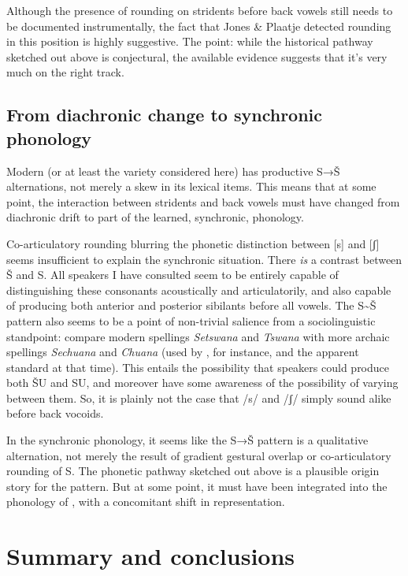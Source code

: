 \documentclass[output=paper,newtxmath,modfonts,nonflat]{langsci/langscibook}
\begin{document}
Although the presence of rounding on stridents before back vowels still needs to be documented instrumentally, the fact that Jones \& Plaatje detected rounding in this position is highly suggestive. The point: while the historical pathway sketched out above is conjectural, the available evidence suggests that it’s very much on the right track.

\subsection{From diachronic change to synchronic phonology}\label{sec:bennett:4.3}

Modern  (or at least the variety considered here) has productive S→Š alternations, not merely a skew in its lexical items. This means that at some point, the interaction between stridents and back vowels must have changed from diachronic drift to part of the learned, synchronic, phonology.

Co-articulatory rounding blurring the phonetic distinction between [s] and [ʃ] seems insufficient to explain the synchronic situation. There \textit{is} a contrast between Š and S. All  speakers I have consulted seem to be entirely capable of distinguishing these consonants acoustically and articulatorily, and also capable of producing both anterior and posterior sibilants before all vowels. The S{\textasciitilde}Š pattern also seems to be a point of non-trivial salience from a sociolinguistic standpoint: compare modern spellings \textit{Setswana} and \textit{Tswana} with more archaic spellings \textit{Sechuana} and \textit{Chuana} (used by \citet{Jones&Plaatje1916}, for instance, and the apparent standard at that time).  This entails the possibility that speakers could produce both ŠU and SU, and moreover have some awareness of the possibility of varying between them. So, it is plainly not the case that /s/ and /ʃ/ simply sound alike before back vocoids.

In the synchronic phonology, it seems like the S→Š pattern is a qualitative alternation, not merely the result of gradient gestural overlap or co-articulatory rounding of S. The phonetic pathway sketched out above is a plausible origin story for the pattern. But at some point, it must have been integrated into the phonology of , with a concomitant shift in representation.

\section{Summary and conclusions}\label{sec:bennett:5}
\end{document}

